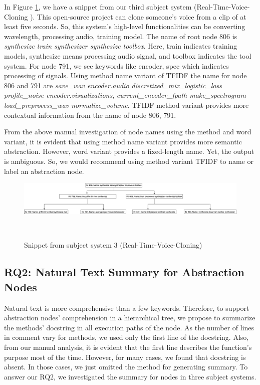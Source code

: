 In Figure \ref{fig:rq1_realTime1}, we have a snippet from our third subject system (Real-Time-Voice-Cloning \cite{realTime}). This open-source project can clone someone's voice from a clip of at least five seconds. So, this system's high-level functionalities can be converting wavelength, processing audio, training model. The name of root node 806 is \textit{synthesize train synthesizer synthesize toolbox}. Here, train indicates training models, synthesize means processing audio signal, and toolbox indicates the tool system. For node 791, we see keywords like encoder, spec which indicates processing of signals. Using method name variant of TFIDF the name for node 806 and 791 are \textit{save\_wav encoder.audio discretized\_mix\_logistic\_loss profile\_noise encoder.visualizations}, \textit{current\_encoder\_fpath make\_spectrogram load\_preprocess\_wav normalize\_volume}. TFIDF method variant provides more contextual information from the name of node 806, 791. 

From the above manual investigation of node names using the method and word variant, it is evident that using method name variant provides more semantic abstraction. However, word variant provides a fixed-length  name. Yet, the output is ambiguous. So, we would recommend using method variant TFIDF to name or label an abstraction node.



\begin{figure}[tb]
  \centering
  \includegraphics[width=\columnwidth]{figures/hla2/rq1_realTime1.png}
  \caption{Snippet from subject system 3 (Real-Time-Voice-Cloning)}~\label{fig:rq1_realTime1}
\end{figure}



\subsection{ RQ2: Natural Text Summary for Abstraction Nodes}
 Natural text is more comprehensive than a few keywords. Therefore, to support abstraction nodes' comprehension in a hierarchical tree, we propose to summarize the methods' docstring in all execution paths of the node. As the number of lines in comment vary for methods,  we used only the first line of the docstring. Also, from our manual analysis, it is evident that the first line describes the function's purpose most of the time. However, for many cases, we found that docstring is absent. In those cases, we just omitted the method for generating summary. To answer our RQ2, we investigated the summary for nodes in three subject systems. 
 
